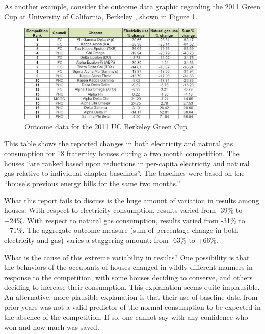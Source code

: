 \documentclass[jou]{apa} %
\begin{document}
As another example, consider the outcome data graphic regarding the 2011 Green Cup at University of
California, Berkeley \cite{Dhong2011}, shown in Figure \ref{fig:ucb-green-cup}.

\begin{figure}[htbp]
\begin{center}
\includegraphics[width=0.8\textwidth]{ucb-green-cup.png.eps}
\caption{Outcome data for the 2011 UC Berkeley Green Cup}
\label{fig:ucb-green-cup}
\end{center}
\end{figure}

This table shows the reported changes in both electricity and natural gas consumption for
18 fraternity houses during a two month competition. The houses ``are ranked based upon
reductions in per-capita electricity and natural gas relative to individual chapter
baselines''.  The baselines were based on the ``house's previous energy bills for the same
two months.''  

What this report fails to discuss is the huge amount of variation in results among
houses. With respect to electricity consumption, results varied from -39\% to +24\%.  With
respect to natural gas consumption, results varied from -31\% to +71\%.  The aggregate
outcome measure (sum of percentage change in both electricity and gas) varies a staggering
amount: from -63\% to +66\%.  

What is the cause of this extreme variability in results?  One possibility is that the behaviors
of the occupants of houses changed in wildly different manners in response to the
competition, with some houses deciding to conserve, and others deciding to increase
their consumption.  This explanation seems quite implausible.  An alternative, more plausible
explanation is that their use of baseline data from prior years was not a valid predictor of
the normal consumption to be expected in the absence of the competition. If so, one
cannot say with any confidence who won and how much was saved. 
\end{document}
